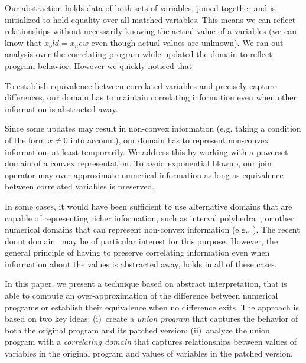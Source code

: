 Our abstraction holds data of both sets of variables, joined together and is initialized to hold equality over all matched variables. This means we can reflect relationships without necessarily knowing the actual value of a variables (we can know that $x_old = x_new$ even though actual values are unknown). We ran out analysis over the correlating program while updated the domain to reflect program behavior. However we quickly noticed that

To establish equivalence between correlated variables and precisely capture differences, our domain has to maintain correlating information even when other information is abstracted away.

Since some updates may result in non-convex information (e.g. taking  a condition of the form $x \neq 0$ into account), our domain has to represent non-convex information, at least temporarily. We address this by working with a powerset domain of a convex representation. To avoid exponential blowup, our join operator may over-approximate numerical information as long as equivalence between correlated variables is preserved.

In some cases, it would have been sufficient to use alternative domains that are capable of representing richer information, such as interval polyhedra~\cite{CMWC:SAS09}, or other numerical domains that can represent non-convex information (e.g., \cite{TODO}). The recent donut domain~\cite{GIBMG:VMCAI12} may be of particular interest for this purpose. However, the general principle of having to preserve correlating information even when information about the values is abstracted away, holds in all of these cases.






In this paper, we present a technique based on abstract interpretation, that is able to compute an over-approximation of the difference between numerical programs or establish their equivalence when no difference exits. The approach is based on two key ideas: (i)~create a \emph{union program} that captures the behavior of both the original program and its patched version; (ii)~analyze the union program with a \emph{correlating domain} that captures relationships between values of variables in the original program and values of variables in the patched version.

